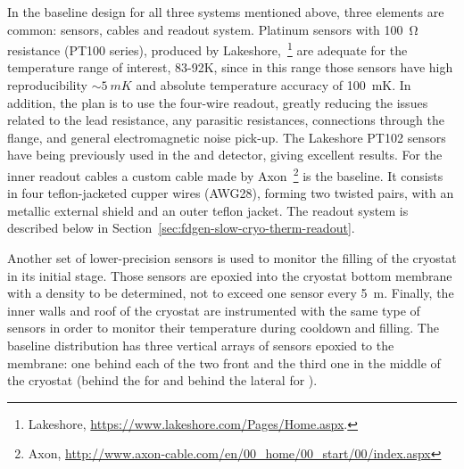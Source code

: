 In the baseline design for all three systems mentioned above, three elements are common: sensors, cables and readout system.
Platinum sensors with \SI{100}{\ohm} resistance (PT100 series), produced by Lakeshore,~\footnote{Lakeshore\texttrademark{}, \url{https://www.lakeshore.com/Pages/Home.aspx}.}
are adequate for the temperature range of interest, 83-92\si{K}, since in this range those sensors have high reproducibility 
$\sim\SI{5}{mK}$ and absolute temperature accuracy of \SI{100}{mK}.
In addition, the plan is to use the four-wire readout, greatly reducing the issues related to the lead resistance, any parasitic resistances,
connections through the flange, and general electromagnetic noise pick-up. The Lakeshore PT102 sensors
have being previously used in the  and  detector,
giving excellent results. For the inner readout cables a custom cable made by Axon~\footnote{Axon\texttrademark{}, \url{http://www.axon-cable.com/en/00_home/00_start/00/index.aspx}} is the baseline. It consists in four teflon-jacketed 
cupper wires (AWG28), forming two twisted pairs, with an metallic external shield
and an outer teflon jacket.
The readout system is described below in  Section~\ref{sec:fdgen-slow-cryo-therm-readout}. %



Another set of lower-precision sensors is used to monitor the filling of the cryostat in its initial stage. Those sensors are epoxied into the cryostat bottom membrane with
a density to be determined, not to exceed one sensor every \SI{5}{m}. 
Finally, the inner walls and roof of the cryostat are instrumented with the same type of sensors in order to monitor their temperature during cooldown and filling.
The baseline distribution has three vertical arrays of sensors epoxied to the membrane: one behind each of the two %
front  and the third one in the middle of the cryostat
(behind the  for \single and behind the lateral %
 for \dual). 

